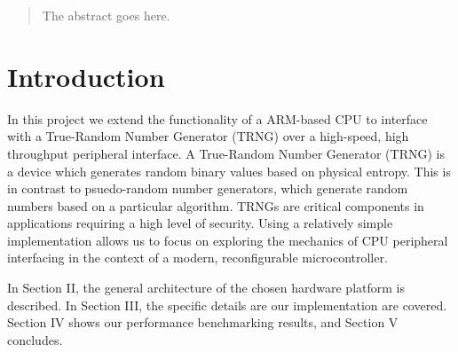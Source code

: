 \documentclass[journal]{IEEEtran}
\begin{document}




\maketitle


\begin{abstract}
The abstract goes here.
\end{abstract}


%
\IEEEpeerreviewmaketitle


\section{Introduction}

In this project we extend the functionality of a ARM-based CPU to interface with a True-Random Number Generator (TRNG) over a high-speed, high throughput peripheral interface.  A True-Random Number Generator (TRNG) is a device which generates random binary values based on physical entropy. This is in contrast to psuedo-random number generators, which generate random numbers based on a particular algorithm. TRNGs are critical components in applications requiring a high level of security. Using a relatively simple implementation allows us to focus on exploring the mechanics of CPU peripheral interfacing in the context of a modern, reconfigurable microcontroller.  

In Section II, the general architecture of the chosen hardware platform is described. In Section III, the specific details are our implementation are covered. Section IV shows our performance benchmarking results, and Section V concludes.
\end{document}
